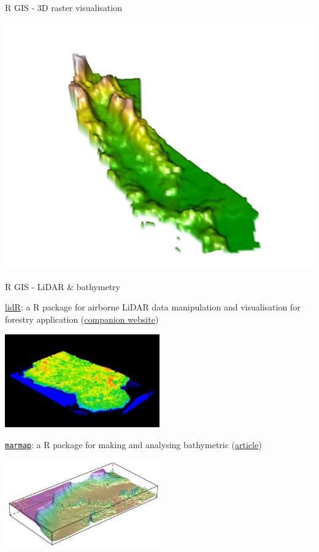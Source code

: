 \documentclass[8pt,ignorenonframetext,]{beamer}
\begin{document}
\begin{frame}{R GIS - 3D raster visualisation}

\includegraphics{imgPres/GIS_rasterVis.png}

\end{frame}

\begin{frame}[fragile]{R GIS - LiDAR \& bathymetry}

\href{https://cran.r-project.org/web/packages/lidR/index.htm}{lidR}: a R
package for airborne LiDAR data manipulation and visualisation for
forestry application
(\href{https://github.com/Jean-Romain/lidR}{companion website})

\includegraphics[width=0.50000\textwidth]{imgPres/GIS_lidar.png}

\href{https://cran.r-project.org/web/packages/marmap/index.htm}{\texttt{marmap}}:
a R package for making and analysing bathymetric
(\href{https://www.ncbi.nlm.nih.gov/pmc/articles/PMC3760912/}{article})

\includegraphics[width=0.50000\textwidth]{imgPres/GIS_bathy.png}

\end{frame}
\end{document}
